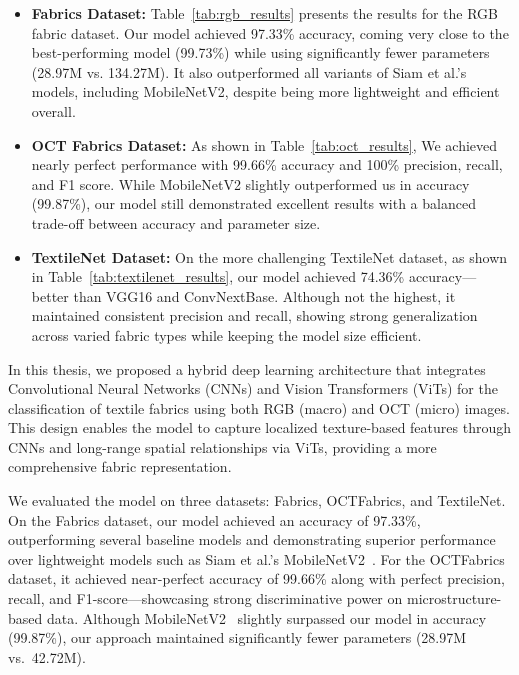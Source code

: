 \begin{itemize}[topsep=0pt, noitemsep]
    \item \textbf{Fabrics Dataset:} Table~\ref{tab:rgb_results} presents the results for the RGB fabric dataset. Our model achieved 97.33\% accuracy, coming very close to the best-performing model (99.73\%) while using significantly fewer parameters (28.97M vs. 134.27M). It also outperformed all variants of Siam et al.’s models, including MobileNetV2, despite being more lightweight and efficient overall.

    \item \textbf{OCT Fabrics Dataset:} As shown in Table~\ref{tab:oct_results}, We achieved nearly perfect performance with 99.66\% accuracy and 100\% precision, recall, and F1 score. While MobileNetV2 slightly outperformed us in accuracy (99.87\%), our model still demonstrated excellent results with a balanced trade-off between accuracy and parameter size.

    \item \textbf{TextileNet Dataset:} On the more challenging TextileNet dataset, as shown in Table~\ref{tab:textilenet_results}, our model achieved 74.36\% accuracy—better than VGG16 and ConvNextBase. Although not the highest, it maintained consistent precision and recall, showing strong generalization across varied fabric types while keeping the model size efficient.
\end{itemize}

In this thesis, we proposed a hybrid deep learning architecture that integrates Convolutional Neural Networks (CNNs) and Vision Transformers (ViTs) for the classification of textile fabrics using both RGB (macro) and OCT (micro) images. This design enables the model to capture localized texture-based features through CNNs and long-range spatial relationships via ViTs, providing a more comprehensive fabric representation.

We evaluated the model on three datasets: Fabrics, OCTFabrics, and TextileNet. On the Fabrics dataset, our model achieved an accuracy of 97.33\%, outperforming several baseline models and demonstrating superior performance over lightweight models such as Siam et al.'s MobileNetV2~\cite{siam2023textilenet}. For the OCTFabrics dataset, it achieved near-perfect accuracy of 99.66\% along with perfect precision, recall, and F1-score—showcasing strong discriminative power on microstructure-based data. Although MobileNetV2~\cite{siam2023textilenet} slightly surpassed our model in accuracy (99.87\%), our approach maintained significantly fewer parameters (28.97M vs.\ 42.72M).

